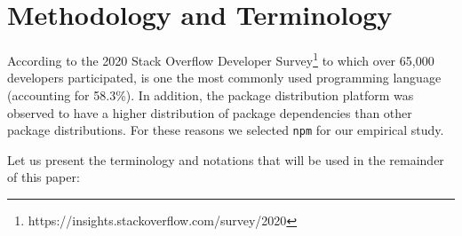 \section{Methodology and Terminology}
\label{sec:method}
According to the 2020 Stack Overflow Developer Survey\footnote{https://insights.stackoverflow.com/survey/2020} to which over 65,000 developers participated, \js is one the most commonly used programming language (accounting for 58.3\%). In addition, the \np package distribution platform was observed to have a higher distribution of package dependencies than other package distributions\cite{Decan:2019:emse}.
For these reasons we selected \texttt{npm} for our empirical study.

Let us present the terminology and notations that will be used in the remainder of this paper:

